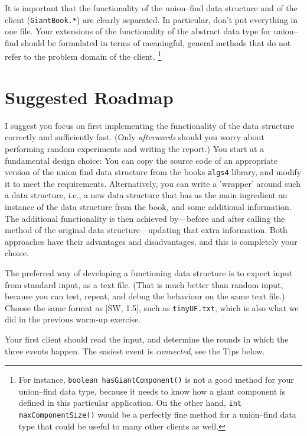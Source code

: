 \documentclass{tufte-handout}
\begin{document}
It is important that the functionality of the union--find data
structure and of the client ({\tt GiantBook.*}) are clearly
separated.
In particular, don't put everything in one file.
Your extensions of the functionality of the abstract data type for union--find should be formulated in terms of meaningful, general methods that do not refer to the problem domain of the client. 
\footnote{For instance, {\tt boolean hasGiantComponent()} is not a good method for your union--find data type, because it needs to know how a giant component is defined in this particular application. On the other hand, {\tt int maxComponentSize()} would be a perfectly fine method for a union--find data type that could be useful to many other clients as well.}

\section{Suggested Roadmap}

I suggest you focus on first implementing the functionality of the data structure correctly and sufficiently fast.
(Only \emph{afterwards} should you worry about performing random experiments and writing the report.)
You start at a fundamental design choice: You can copy the source code of an appropriate version of the union find data structure from the books \texttt{algs4} library, and modify it to meet the requirements. 
Alternatively, you can write a 'wrapper' around such a data structure, i.e., a new data structure that has as the main ingredient an instance of the data structure from the book, and some additional information. 
The additional functionality is then achieved by---before and after calling the method of the original data structure---updating that extra information.
Both approaches have their advantages and disadvantages, and this is completely your choice.

The preferred way of developing a functioning data structure is to expect input from standard input, as a text file.
(That is much better than random input, because you can test, repeat, and debug the behaviour on the same text file.)
Choose the same format as [SW, 1.5], such as \texttt{tinyUF.txt}, which is also what we did in the previous warm-up exercise.

Your first client should read the input, and determine the rounds in which the three events happen.
The easiest event is \emph{connected}, see the Tips below.
\end{document}

